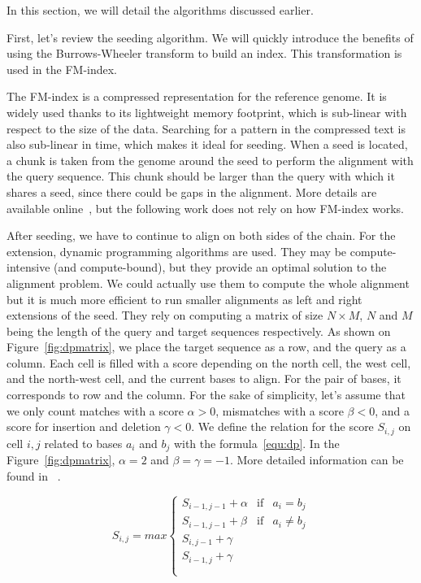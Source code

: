 In this section, we will detail the algorithms discussed earlier.

First, let's review the seeding algorithm. We will quickly introduce the benefits of using the Burrows-Wheeler transform to build an index. This transformation is used in the FM-index.

The FM-index is a compressed representation for the reference genome. It is widely used thanks to its lightweight memory footprint, which is sub-linear with respect to the size of the data. Searching for a pattern in the compressed text is also sub-linear in time, which makes it ideal for seeding. When a seed is located, a chunk is taken from the genome around the seed to perform the alignment with the query sequence. This chunk should be larger than the query with which it shares a seed, since there could be gaps in the alignment. More details are available online~\cite{wiki:FMIndex}, but the following work does not rely on how FM-index works. 

After seeding, we have to continue to align on both sides of the chain. For the extension, dynamic programming algorithms are used. They may be compute-intensive (and compute-bound), but they provide an optimal solution to the alignment problem. We could actually use them to compute the whole alignment but it is much more efficient to run smaller alignments as left and right extensions of the seed. They rely on computing a matrix of size $N \times M$, $N$ and $M$ being the length of the query and target sequences respectively. As shown on Figure~\ref{fig:dpmatrix}, we place the target sequence as a row, and the query as a column. Each cell is filled with a score depending on the north cell, the west cell, and the north-west cell, and the current bases to align. For the pair of bases, it corresponds to row and the column. For the sake of simplicity, let's assume that we only count matches with a score $\alpha > 0$, mismatches with a score $\beta < 0$, and a score for insertion and deletion $\gamma < 0$. We define the relation for the score $S_{i,j}$ on cell $i,j$ related to bases $a_i$ and $b_j$ with the formula~\ref{equ:dp}. In the Figure~\ref{fig:dpmatrix}, $\alpha = 2$ and $\beta = \gamma = -1$. More detailed information can be found in ~\cite{Aluru:2005:HCM:1121650}.

\begin{equation}
	S_{i,j} = max \left\{
	\begin{array}{llll}
		S_{i-1, j-1} + \alpha & \mbox{if} & a_i = b_j \\
		S_{i-1, j-1} + \beta & \mbox{if} & a_i \neq b_j \\
		S_{i, j-1} + \gamma \\
		S_{i-1, j} + \gamma\\
		 \\
	\end{array}
	\right.
	\label{equ:dp}
\end{equation}




